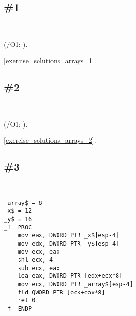 \section{\Exercises}

\subsection{\Exercise \#1}
\label{exercise_array_1}

\WhatThisCodeDoes\



(/O1: ).





\Answer\: \ref{exercise_solutions_arrays_1}.

\subsection{\Exercise \#2}
\label{exercise_array_2}

\WhatThisCodeDoes\



(/O1: ).





\Answer\: \ref{exercise_solutions_arrays_2}.

\subsection{\Exercise \#3}
\label{exercise_array_3}

\WhatThisCodeDoes\


\begin{lstlisting}[caption=\Optimizing MSVC 2010]
_array$ = 8
_x$ = 12
_y$ = 16
_f	PROC
	mov	eax, DWORD PTR _x$[esp-4]
	mov	edx, DWORD PTR _y$[esp-4]
	mov	ecx, eax
	shl	ecx, 4
	sub	ecx, eax
	lea	eax, DWORD PTR [edx+ecx*8]
	mov	ecx, DWORD PTR _array$[esp-4]
	fld	QWORD PTR [ecx+eax*8]
	ret	0
_f	ENDP
\end{lstlisting}

